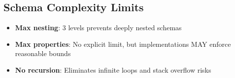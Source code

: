 \subsection{Schema Complexity Limits}

\begin{itemize}
  \item \textbf{Max nesting}: 3 levels prevents deeply nested schemas
  \item \textbf{Max properties}: No explicit limit, but implementations MAY enforce reasonable bounds
  \item \textbf{No recursion}: Eliminates infinite loops and stack overflow risks
\end{itemize}

